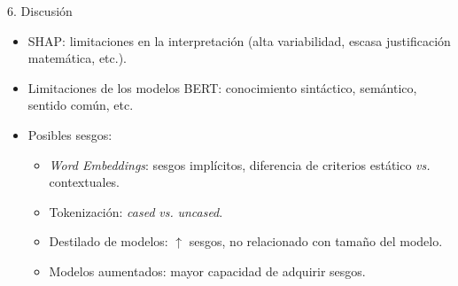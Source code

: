 \begin{frame}{6. Discusión}

\begin{itemize}
    \item SHAP: limitaciones en la interpretación (alta variabilidad, escasa justificación matemática, etc.).
    \item Limitaciones de los modelos BERT: conocimiento sintáctico, semántico, sentido común, etc.
    \item Posibles sesgos:
    \begin{itemize}
        \item \textit{Word Embeddings}: sesgos implícitos, diferencia de criterios estático \textit{vs.} contextuales.
        \item Tokenización: \textit{cased} \textit{vs.} \textit{uncased}.
        \item Destilado de modelos: $\uparrow$ sesgos, no relacionado con tamaño del modelo.
        \item Modelos aumentados: mayor capacidad de adquirir sesgos.
    \end{itemize}
\end{itemize}

\end{frame}